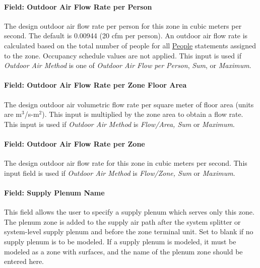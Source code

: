 \paragraph{Field: Outdoor Air Flow Rate per Person}\label{field-outdoor-air-flow-rate-per-person-7}

The design outdoor air flow rate per person for this zone in cubic meters per second. The default is 0.00944 (20 cfm per person). An outdoor air flow rate is calculated based on the total number of people for all \hyperref[people]{People} statements assigned to the zone. Occupancy schedule values are not applied. This input is used if \emph{Outdoor Air Method} is one of \emph{Outdoor Air Flow per Person}, \emph{Sum}, or \emph{Maximum}.

\paragraph{Field: Outdoor Air Flow Rate per Zone Floor Area}\label{field-outdoor-air-flow-rate-per-zone-floor-area-7}

The design outdoor air volumetric flow rate per square meter of floor area (units are m\(^{3}\)/s-m\(^{2}\)). This input is multiplied by the zone area to obtain a flow rate. This input is used if \emph{Outdoor Air Method} is \emph{Flow/Area, Sum} or \emph{Maximum}.

\paragraph{Field: Outdoor Air Flow Rate per Zone}\label{field-outdoor-air-flow-rate-per-zone-7}

The design outdoor air flow rate for this zone in cubic meters per second. This input field is used if \emph{Outdoor Air Method} is \emph{Flow/Zone, Sum} or \emph{Maximum}.

\paragraph{Field: Supply Plenum Name}\label{field-supply-plenum-name}

This field allows the user to specify a supply plenum which serves only this zone. The plenum zone is added to the supply air path after the system splitter or system-level supply plenum and before the zone terminal unit. Set to blank if no supply plenum is to be modeled. If a supply plenum is modeled, it must be modeled as a zone with surfaces, and the name of the plenum zone should be entered here.

